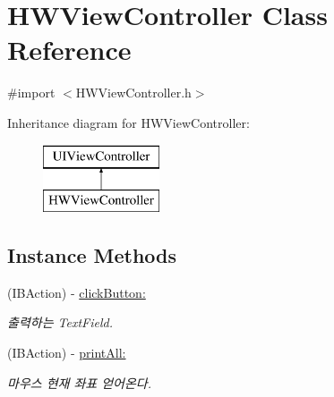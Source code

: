 \hypertarget{interface_h_w_view_controller}{\section{H\-W\-View\-Controller Class Reference}
\label{interface_h_w_view_controller}
}


{\ttfamily \#import $<$H\-W\-View\-Controller.\-h$>$}

Inheritance diagram for H\-W\-View\-Controller\-:\begin{figure}[H]
\begin{center}
\leavevmode
\includegraphics[height=2.000000cm]{interface_h_w_view_controller}
\end{center}
\end{figure}
\subsection*{Instance Methods}
\begin{DoxyCompactItemize}
\item 
(I\-B\-Action) -\/ \hyperlink{interface_h_w_view_controller_a03fef981b6ae5eccf671e0606899f3ce}{click\-Button\-:}
\begin{DoxyCompactList}\small\item\em 출력하는 Text\-Field. \end{DoxyCompactList}\item 
(I\-B\-Action) -\/ \hyperlink{interface_h_w_view_controller_a349c84487ddc73c2fadee8b574d672fa}{print\-All\-:}
\begin{DoxyCompactList}\small\item\em 마우스 현재 좌표 얻어온다. \end{DoxyCompactList}\end{DoxyCompactItemize}
